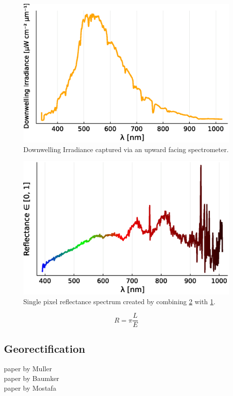 \documentclass[remotesensing,article,submit,pdftex,moreauthors]{Definitions/mdpi}
\begin{document}
\begin{figure}[H]
\includegraphics[width=10.5 cm]{images/spectra/solar_irradiance.eps}
\caption{Downwelling Irradiance captured via an upward facing spectrometer.\label{irradiancePlot}}
\end{figure}   

\begin{figure}[H]
\includegraphics[width=10.5 cm]{images/spectra/reflectance_rainbow.eps}
\caption{Single pixel reflectance spectrum created by combining \ref{radiancePlot} with \ref{irradiancePlot}.\label{radiancePlot}}
\end{figure}   


\begin{equation}
    R = \pi \frac{L}{E}
\end{equation}


\subsection{Georectification}
paper by Muller \cite{GeorectificationMuller} \\ 
paper by Baumker \cite{GeorectificationBaumker} \\ 
paper by Mostafa \cite{GeorectificationMostafa} \\ 
\end{document}
